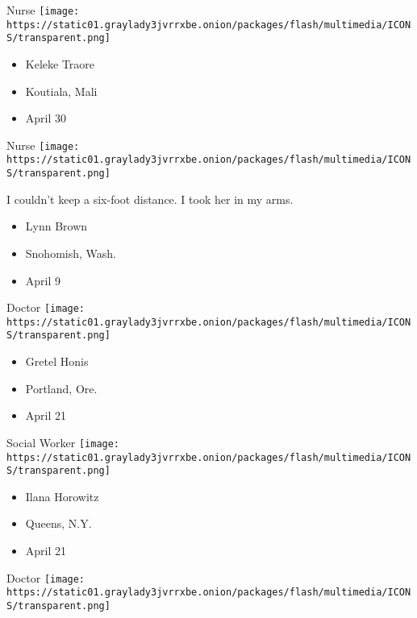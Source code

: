 \protect\hyperlink{item-keleke-traore}{}

Nurse
\texttt{[image: https://static01.graylady3jvrrxbe.onion/packages/flash/multimedia/ICONS/transparent.png]}

\begin{itemize}
\tightlist
\item
  Keleke Traore
\item
  Koutiala, Mali
\item
  April 30
\end{itemize}

\protect\hyperlink{item-lynn-brown}{}

Nurse
\texttt{[image: https://static01.graylady3jvrrxbe.onion/packages/flash/multimedia/ICONS/transparent.png]}

I couldn't keep a six-foot distance. I took her in my arms.

\begin{itemize}
\tightlist
\item
  Lynn Brown
\item
  Snohomish, Wash.
\item
  April 9
\end{itemize}

\protect\hyperlink{item-gretel-honis}{}

Doctor
\texttt{[image: https://static01.graylady3jvrrxbe.onion/packages/flash/multimedia/ICONS/transparent.png]}

\begin{itemize}
\tightlist
\item
  Gretel Honis
\item
  Portland, Ore.
\item
  April 21
\end{itemize}

\protect\hyperlink{item-ilana-horowitz}{}

Social Worker
\texttt{[image: https://static01.graylady3jvrrxbe.onion/packages/flash/multimedia/ICONS/transparent.png]}

\begin{itemize}
\tightlist
\item
  Ilana Horowitz
\item
  Queens, N.Y.
\item
  April 21
\end{itemize}

\protect\hyperlink{item-christelle-nancy-diane-mike}{}

Doctor
\texttt{[image: https://static01.graylady3jvrrxbe.onion/packages/flash/multimedia/ICONS/transparent.png]}


